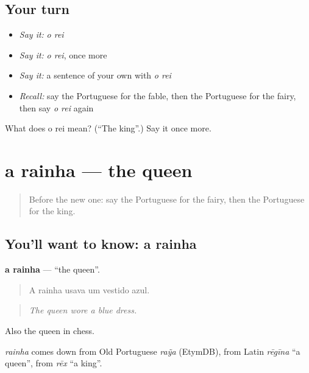 \subsection*{Your turn}
\begin{itemize}
\raggedright
  \item \emph{Say it:} \emph{o rei}
  \item \emph{Say it:} \emph{o rei}, once more
  \item \emph{Say it:} a sentence of your own with \emph{o rei}
  \item \emph{Recall:} say the Portuguese for the fable, then the Portuguese for the fairy, then say \emph{o rei} again
\end{itemize}

\begin{tcolorbox}[breakable,colback=teal!4,colframe=teal!35!black,title={Before you move on}]
What does o rei mean? (\textquotedblleft{}The king\textquotedblright{}.) Say it once more.
\end{tcolorbox}
\section[a rainha]{a rainha — the queen}

\label{lesson:PT-C327-rainha}



\begin{quote}
Before the new one: say the Portuguese for the fairy, then the Portuguese for the king.
\end{quote}

\subsection*{You'll want to know: a rainha}
\textbf{a rainha} — \textquotedblleft{}the queen\textquotedblright{}.

\begin{quote}
A rainha usava um vestido azul.
\end{quote}

\begin{quote}
\emph{The queen wore a blue dress.}
\end{quote}

Also the queen in chess.

\begin{cousinweb}
\emph{rainha} comes down from Old Portuguese \emph{raỹa} (EtymDB), from Latin \emph{rēgīna} \textquotedblleft{}a queen\textquotedblright{}, from \emph{rēx} \textquotedblleft{}a king\textquotedblright{}.
\end{cousinweb}

